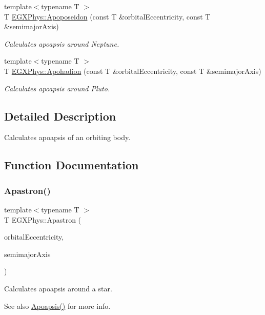 \begin{DoxyCompactItemize}
{\footnotesize template$<$typename T $>$ }\\T \hyperlink{group___apoapsis_ga89679654fff13176e989536163a27f9d}{E\+G\+X\+Phys\+::\+Apoposeidon} (const T \&orbital\+Eccentricity, const T \&semimajor\+Axis)
\begin{DoxyCompactList}\small\item\em Calculates apoapsis around Neptune. \end{DoxyCompactList}\item 
{\footnotesize template$<$typename T $>$ }\\T \hyperlink{group___apoapsis_gaa16847ddc5763c327067075dcb6a3353}{E\+G\+X\+Phys\+::\+Apohadion} (const T \&orbital\+Eccentricity, const T \&semimajor\+Axis)
\begin{DoxyCompactList}\small\item\em Calculates apoapsis around Pluto. \end{DoxyCompactList}\end{DoxyCompactItemize}


\subsection{Detailed Description}
Calculates apoapsis of an orbiting body. 

\subsection{Function Documentation}
\mbox{\label{group___apoapsis_ga2fc1c406ce10f59b4f325150aecd279a}} 
\subsubsection{\texorpdfstring{Apastron()}{Apastron()}}
{\footnotesize\ttfamily template$<$typename T $>$ \\
T E\+G\+X\+Phys\+::\+Apastron (\begin{DoxyParamCaption}\item[{const T \&}]{orbital\+Eccentricity,  }\item[{const T \&}]{semimajor\+Axis }\end{DoxyParamCaption})}



Calculates apoapsis around a star. 

\begin{DoxySeeAlso}{See also}
\hyperlink{group___apoapsis_gaf962e650bf84a568458e8eb39b1c61ba}{Apoapsis()} for more info. 
\end{DoxySeeAlso}
\mbox{\label{group___apoapsis_ga77dadb4d082a441c8e85203c983722c7}} 
